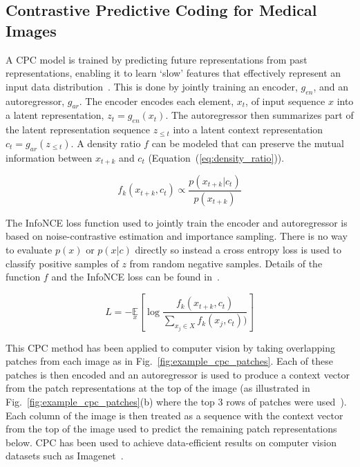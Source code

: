 \subsection{Contrastive Predictive Coding for Medical Images}
\label{subsec:unsupervised_cpc}
A CPC model is trained by predicting future representations from past representations, enabling it to learn `slow' features that effectively represent an input data distribution~\cite{henaff2019data,oord2018representation}. This is done by jointly training an encoder, \(g_{en}\), and an autoregressor, \(g_{ar}\). The encoder encodes each element, \(x_t\), of input sequence \(x\) into a latent representation, \(z_t = g_{en}(x_t)\). The autoregressor then summarizes part of the latent representation sequence \(z_{\le t}\) into a latent context representation \(c_t = g_{ar}(z_{\le t})\). A density ratio \(f\) can be modeled that can preserve the mutual information between \(x_{t+k}\) and \(c_t\) (Equation~(\ref{eq:density_ratio})).

\begin{equation}
	f_k(x_{t+k}, c_t) \propto \frac{p(x_{t+k}|c_t)}{p(x_{t+k})}
	\label{eq:density_ratio}
\end{equation}

The InfoNCE loss function used to jointly train the encoder and autoregressor is based on noise-contrastive estimation and importance sampling. There is no way to evaluate \(p(x)\) or \(p(x|c)\) directly so instead a cross entropy loss is used to classify positive samples of \(z\) from random negative samples. Details of the function \(f\) and the InfoNCE loss can be found in~\cite{oord2018representation}.

\begin{equation}
	L=-\underset{x}{\mathbb{E}}\left[\log\frac{f_k(x_{t+k},c_t)}{\sum_{x_j\in X}f_k(x_j,c_t))}\right]
	\label{eq:InfoNCE}
\end{equation} 

This CPC method has been applied to computer vision by taking overlapping patches from each image as in Fig.~\ref{fig:example_cpc_patches}. Each of these patches is then encoded and an autoregressor is used to produce a context vector from the patch representations at the top of the image (as illustrated in Fig.~\ref{fig:example_cpc_patches}(b) where the top 3 rows of patches were used~\cite{oord2018representation}). Each column of the image is then treated as a sequence with the context vector from the top of the image used to predict the remaining patch representations below. CPC has been used to achieve data-efficient results on computer vision datasets such as Imagenet~\cite{deng2009imagenet}.

